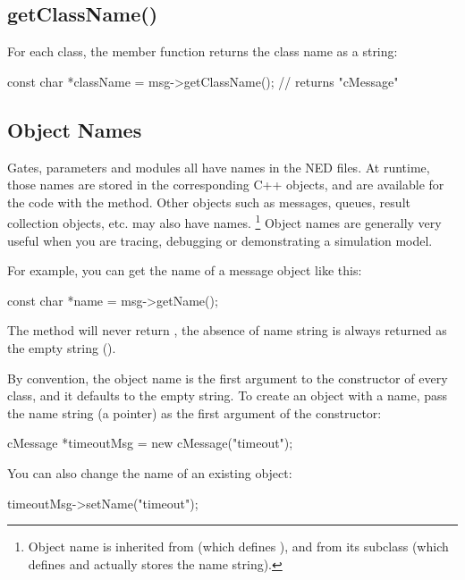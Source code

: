 \subsection{getClassName()}
\label{sec:sim-lib:classname}


For each class, the  member function returns the class
name as a string:

\begin{cpp}
const char *className = msg->getClassName(); // returns "cMessage"
\end{cpp}


\subsection{Object Names}
\label{sec:sim-lib:name}

Gates, parameters and modules all have names in the NED files. At runtime,
those names are stored in the corresponding C++ objects, and are available
for the code with the  method. Other objects such as messages,
queues, result collection objects, etc. may also have names.
  \footnote{Object name is inherited from  (which defines
  ), and from its subclass  (which
  defines  and actually stores the name string).}
Object names are generally very useful when you are tracing, debugging or
demonstrating a simulation model.

For example, you can get the name of a message object like this:

\begin{cpp}
const char *name = msg->getName();
\end{cpp}

The  method will never return , the absence
of name string is always returned as the empty string ().

By convention, the object name is the first argument to the constructor
of every class, and it defaults to the empty string. To create an object with
a name, pass the name string (a  pointer) as the first
argument of the constructor:

\begin{cpp}
cMessage *timeoutMsg = new cMessage("timeout");
\end{cpp}

You can also change the name of an existing object:

\begin{cpp}
timeoutMsg->setName("timeout");
\end{cpp}

